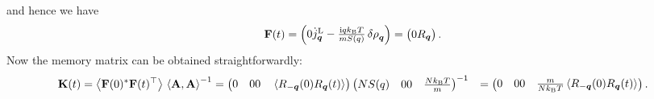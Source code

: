 \documentclass[hyperref, a4paper]{article}
\newcommand*{\ii}{\mathrm{i}}
\def\\{}%
\begin{document}
and hence we have 
\begin{equation}
    \vb{F}(t) = \pmqty{0 \\ \dot{j}_{\vb*{q}}^\text{L} - \frac{\ii q k_\text{B} T}{m S(q)} \var{\rho}_{\vb*{q}} }
    = \pmqty{0 \\ R_{\vb*{q}}}.
    \label{eq:f-q-eq}
\end{equation}
Now the memory matrix can be obtained straightforwardly:
\begin{equation}
    \begin{aligned}
        \vb{K}(t) &= \expval{\vb{F}(0)^* \vb{F}(t)^\top} \expval*{\vb{A}, \vb{A}}^{-1} = \pmqty{0 & 0 \\ 0 & \expval*{R_{-\vb*{q}}(0) R_{\vb*{q}}(t)}} \pmqty{
        N S(q) & 0 \\ 
        0 &  \frac{N k_\text{B} T}{m}
    }^{-1} \\
    &=  \pmqty{0 & 0 \\ 0 & \frac{m}{N k_\text{B} T} \expval*{R_{-\vb*{q}}(0) R_{\vb*{q}}(t)}}.
    \end{aligned}
    \label{eq:k-eq}
\end{equation}
\end{document}
